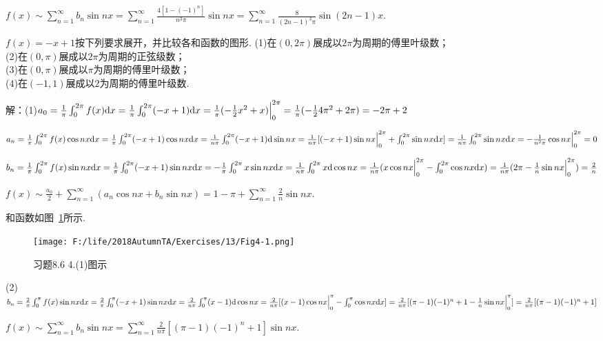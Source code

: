 \documentclass[12pt,UTF8]{ctexart}
\newcommand\Ser[1]{\sum_{n=#1}^\infty}
\begin{document}
\begin{enumerate}
$f(x)\sim\Ser{1}b_n\sin nx=\Ser{1}\frac{4[1-(-1)^n]}{n^3\pi}\sin nx=\Ser{1}\frac8{(2n-1)^3\pi}\sin(2n-1)x$.

$f(x)=-x+1$按下列要求展开，并比较各和函数的图形.
\newline
(1)在$(0,2\pi)$展成以$2\pi$为周期的傅里叶级数；\\
(2)在$(0,\pi)$展成以$2\pi$为周期的正弦级数；\\
(3)在$(0,\pi)$展成以$\pi$为周期的傅里叶级数；\\
(4)在$(-1,1)$展成以$2$为周期的傅里叶级数.

解：(1)$a_0=\frac1\pi\int_0^{2\pi}f(x)\mathrm dx=\frac1\pi\int_0^{2\pi}(-x+1)\mathrm dx=\frac1\pi(-\frac12x^2+x)\Big|_0^{2\pi}=\frac1\pi(-\frac124\pi^2+2\pi)\\
=-2\pi+2$

$a_n=\frac1\pi\int_0^{2\pi}f(x)\cos nx\mathrm dx=\frac1\pi\int_0^{2\pi}(-x+1)\cos nx\mathrm dx=\frac1{n\pi}\int_0^{2\pi}(-x+1)\mathrm d\sin nx\\
=\frac1{n\pi}[(-x+1)\sin nx\Big|_0^{2\pi}+\int_0^{2\pi}\sin nx\mathrm dx]=\frac1{n\pi}\int_0^{2\pi}\sin nx\mathrm dx=-\frac1{n^2\pi}\cos nx\Big|_0^{2\pi}=0$

$b_n=\frac1\pi\int_0^{2\pi}f(x)\sin nx\mathrm dx=\frac1\pi\int_0^{2\pi}(-x+1)\sin nx\mathrm dx=-\frac1\pi\int_0^{2\pi}x\sin nx\mathrm dx=\frac1{n\pi}\int_0^{2\pi}x\mathrm d\cos nx\\
=\frac1{n\pi}(x\cos nx\Big|_0^{2\pi}-\int_0^{2\pi}\cos nx\mathrm dx)=\frac1{n\pi}(2\pi-\frac1n\sin nx\Big|_0^{2\pi})=\frac2n$

$f(x)\sim\frac{a_0}2+\Ser{1}(a_n\cos nx+b_n\sin nx)=1-\pi+\Ser{1}\frac2n\sin nx$.

和函数如图~\ref{4-1}所示.
\begin{figure}[H]
\begin{center}
\texttt{[image: F:/life/2018AutumnTA/Exercises/13/Fig4-1.png]}
\end{center}
\caption{习题8.6 4.(1)图示}
\label{4-1}
\end{figure}
(2)$b_n=\frac2\pi\int_0^\pi f(x)\sin nx\mathrm dx=\frac2\pi\int_0^\pi(-x+1)\sin nx\mathrm dx=\frac2{n\pi}\int_0^\pi(x-1)\mathrm d\cos nx\\
=\frac2{n\pi}[(x-1)\cos nx\Big|_0^\pi-\int_0^\pi\cos nx\mathrm dx]=\frac2{n\pi}[(\pi-1)(-1)^n+1-\frac1n\sin nx\Big|_0^\pi]\\
=\frac2{n\pi}[(\pi-1)(-1)^n+1]$

$f(x)\sim\Ser{1}b_n\sin nx=\Ser{1}\frac2{n\pi}[(\pi-1)(-1)^n+1]\sin nx$.


\end{enumerate}
\end{document}
